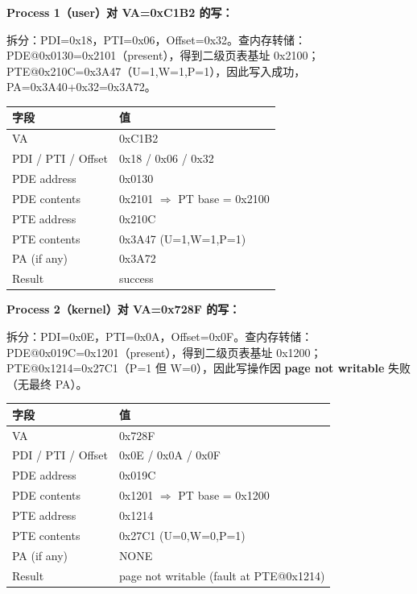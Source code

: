 \documentclass[fleqn]{ctexart}
\begin{document}
\vspace{2mm}
\noindent\textbf{Process 1（user）对 VA=0xC1B2 的写：}

\noindent 拆分：PDI=0x18，PTI=0x06，Offset=0x32。查内存转储：PDE@0x0130=0x2101（present），得到二级页表基址 0x2100；PTE@0x210C=0x3A47（U=1,W=1,P=1），因此写入成功，PA=0x3A40+0x32=0x3A72。

\begin{center}
\begin{tabular}{|p{}|p{}|}
\hline
\textbf{字段} & \textbf{值} \\
\hline
VA & 0xC1B2 \\
\hline
PDI / PTI / Offset & 0x18 / 0x06 / 0x32 \\
\hline
PDE address & 0x0130 \\
\hline
PDE contents & 0x2101 $\Rightarrow$ PT base = 0x2100 \\
\hline
PTE address & 0x210C \\
\hline
PTE contents & 0x3A47 (U=1,W=1,P=1) \\
\hline
PA (if any) & 0x3A72 \\
\hline
Result & success \\
\hline
\end{tabular}
\end{center}

\vspace{2mm}
\noindent\textbf{Process 2（kernel）对 VA=0x728F 的写：}

\noindent 拆分：PDI=0x0E，PTI=0x0A，Offset=0x0F。查内存转储：PDE@0x019C=0x1201（present），得到二级页表基址 0x1200；PTE@0x1214=0x27C1（P=1 但 W=0），因此写操作因 \textbf{page not writable} 失败（无最终 PA）。

\begin{center}
\begin{tabular}{|p{}|p{}|}
\hline
\textbf{字段} & \textbf{值} \\
\hline
VA & 0x728F \\
\hline
PDI / PTI / Offset & 0x0E / 0x0A / 0x0F \\
\hline
PDE address & 0x019C \\
\hline
PDE contents & 0x1201 $\Rightarrow$ PT base = 0x1200 \\
\hline
PTE address & 0x1214 \\
\hline
PTE contents & 0x27C1 (U=0,W=0,P=1) \\
\hline
PA (if any) & NONE \\
\hline
Result & page not writable (fault at PTE@0x1214) \\
\hline
\end{tabular}
\end{center}
\end{document}
